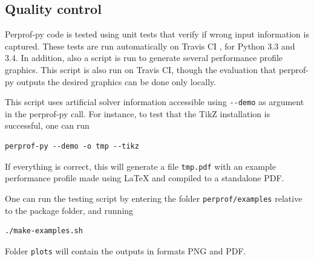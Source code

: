 \subsection*{Quality control}

    Perprof-py code is tested using unit tests that verify if wrong input
    information is captured. These tests are run automatically on Travis CI
    \cite{url:travis}, for Python 3.3 and 3.4.
    In addition, also a script is run to generate several performance profile
    graphics. This script is also run on Travis CI, though the evaluation
    that perprof-py outputs the desired  graphics can be done only locally.

    This script uses artificial solver information accessible using \verb+--demo+
    as argument in the perprof-py call.
    For instance, to test that the TikZ installation is successful, one can run
\begin{verbatim}
perprof-py --demo -o tmp --tikz
\end{verbatim}
    If everything is correct, this will generate a file \verb+tmp.pdf+ with an
    example performance profile made using LaTeX and compiled to a standalone
    PDF.

    One can run the testing script
    by entering the folder
    \verb+perprof/examples+ relative to the package folder, and running
\begin{verbatim}
./make-examples.sh
\end{verbatim}
    Folder \verb+plots+ will contain the outputs in formats PNG and PDF.
